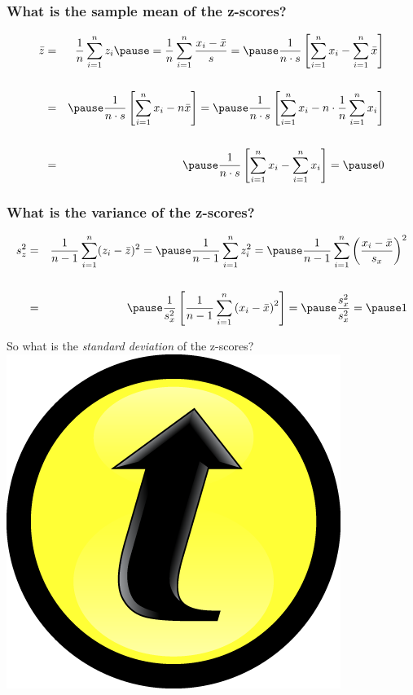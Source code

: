 \documentclass[handout]{beamer}
\begin{document}

\begin{frame}
\frametitle{What is the sample mean of the z-scores?}
\begin{eqnarray*}
 \bar{z} &=& \frac{1}{n}\sum_{i=1}^n z_i \pause= \frac{1}{n} \sum_{i=1}^n \frac{x_i - \bar{x}}{s}= \pause\frac{1}{n\cdot s} \left[\sum_{i=1}^n x_i  - \sum_{i=1}^n \bar{x}  \right]\\ \\
 &=& \pause\frac{1}{n\cdot s} \left[\sum_{i=1}^n x_i  - n\bar{x}  \right] = \pause\frac{1}{n\cdot s} \left[\sum_{i=1}^n x_i - n\cdot \frac{1}{n} \sum_{i=1}^n x_i  \right] \\ \\
 	&=&\pause \frac{1}{n\cdot s} \left[\sum_{i=1}^n x_i -  \sum_{i=1}^n x_i  \right]  = \pause 0
\end{eqnarray*}
\end{frame}



\begin{frame}
\frametitle{What is the variance of the z-scores?}
\begin{eqnarray*}
	s^2_z &=& \frac{1}{n-1}\sum_{i=1}^n (z_i - \bar{z})^2 =\pause \frac{1}{n-1}\sum_{i=1}^n z_i^2 = \pause \frac{1}{n-1} \sum_{i=1}^n \left(\frac{x_i - \bar{x}}{s_x}\right)^2\\\\
	&=& \pause \frac{1}{s_x^2} \left[ \frac{1}{n-1} \sum_{i=1}^n \left(x_i - \bar{x}\right)^2 \right] = \pause \frac{s_x^2}{s_x^2} = \pause 1
	\end{eqnarray*}
	
	\pause
	\vspace{5em}
	\alert{So what is the \emph{standard deviation} of the z-scores? \hfill \includegraphics[scale = 0.03]{./images/clicker} }
\end{frame}
\end{document}
